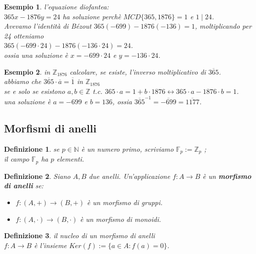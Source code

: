 \documentclass[a4paper,12pt]{article}
\theoremstyle{def}
\newtheorem*{definition}{Definizione}
\theoremstyle{prop}
\theoremstyle{esempio}
\newtheorem*{example}{Esempio}
\theoremstyle{dimostrazione}
\theoremstyle{teo}
\theoremstyle{osservazione}
\begin{document}
\begin{example}
    l'equazione diofantea:\\
    \(365x - 1876y = 24\) ha soluzione perchè \(MCD \{365,1876\} = 1\) e \(1 \mid 24\).\\
    Avevamo l'identità di Bézout \(365(-699) - 1876(-136) = 1\), moltiplicando per 24 otteniamo\\
    \(365(-699 \cdot 24) - 1876(-136 \cdot 24) = 24\).\\
    ossia una soluzione è \(x = -699 \cdot 24\) e \(y = -136 \cdot 24\).
\end{example}

\begin{example}
    in \(\mathbb{Z}_{1876}\) calcolare, se esiste, l'inverso moltiplicativo di \(\overline{365}\).\\
    abbiamo che \(\overline{365} \cdot \overline{a} = \overline{1}\) in \(\mathbb{Z}_{1876}\)\\
    se e solo se esistono \(a,b \in \mathbb{Z}\) t.c. \(365 \cdot a = 1 + b \cdot 1876 \leftrightarrow 365 \cdot a - 1876 \cdot b = 1\).\\
    una soluzione è \(a = -699\) e \(b = 136\), ossia \(\overline{365}^{-1} = \overline{-699} = \overline{1177}\).
\end{example}
\newpage

\subsection{Morfismi di anelli}

\begin{definition}
    se \(p \in \mathbb{N}\) è un numero primo, scriviamo \(\mathbb{F}_p := \mathbb{Z}_p\) ;\\
    il campo \(\mathbb{F}_p\) ha \(p\) elementi.
\end{definition}

\begin{definition}
    Siano \(A,B\) due anelli. Un'applicazione \(f : A \rightarrow B\) è un \textbf{morfismo di anelli} se:
    \
    \begin{itemize}
        \item \(f: (A,+) \rightarrow (B,+)\) è un morfismo di gruppi.
        \item \(f: (A,\cdot) \rightarrow (B,\cdot)\) è un morfismo di monoidi.
    \end{itemize}
\end{definition}

\begin{definition}
    il nucleo di un morfismo di anelli\\
    \(f : A \rightarrow B\) è l'insieme \(Ker(f):=\{a \in A : f(a) = 0\}\).\\
\end{definition}
\end{document}
